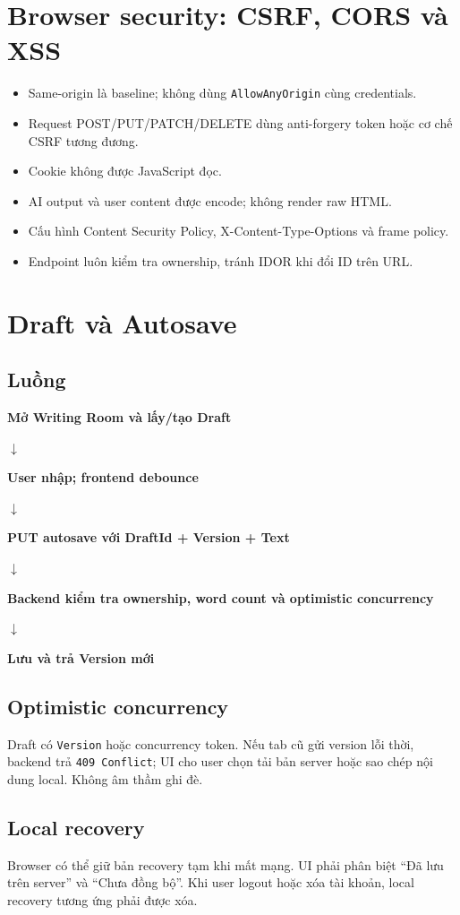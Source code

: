 \documentclass[11pt,a4paper]{article}
\newcommand{\flowarrow}{\par\centering\sffamily\color{BandBlue}\Large$\downarrow$\par}
\newcommand{\flowstep}[1]{\par\centering\sffamily\bfseries #1\par}
\begin{document}
\section{Browser security: CSRF, CORS và XSS}

\begin{itemize}
  \item Same-origin là baseline; không dùng \texttt{AllowAnyOrigin} cùng credentials.
  \item Request POST/PUT/PATCH/DELETE dùng anti-forgery token hoặc cơ chế CSRF tương đương.
  \item Cookie không được JavaScript đọc.
  \item AI output và user content được encode; không render raw HTML.
  \item Cấu hình Content Security Policy, X-Content-Type-Options và frame policy.
  \item Endpoint luôn kiểm tra ownership, tránh IDOR khi đổi ID trên URL.
\end{itemize}

\section{Draft và Autosave}

\subsection{Luồng}
\begin{flowbox}
\flowstep{Mở Writing Room và lấy/tạo Draft}
\flowarrow
\flowstep{User nhập; frontend debounce}
\flowarrow
\flowstep{PUT autosave với DraftId + Version + Text}
\flowarrow
\flowstep{Backend kiểm tra ownership, word count và optimistic concurrency}
\flowarrow
\flowstep{Lưu và trả Version mới}
\end{flowbox}

\subsection{Optimistic concurrency}
Draft có \texttt{Version} hoặc concurrency token. Nếu tab cũ gửi version lỗi thời, backend trả \texttt{409 Conflict}; UI cho user chọn tải bản server hoặc sao chép nội dung local. Không âm thầm ghi đè.

\subsection{Local recovery}
Browser có thể giữ bản recovery tạm khi mất mạng. UI phải phân biệt ``Đã lưu trên server'' và ``Chưa đồng bộ''. Khi user logout hoặc xóa tài khoản, local recovery tương ứng phải được xóa.
\end{document}
